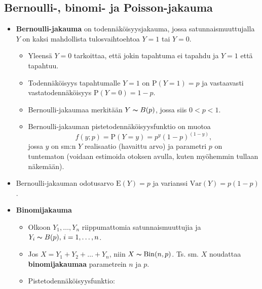 \documentclass[
]{book}
\providecommand{\tightlist}{%
  \setlength{\itemsep}{0pt}\setlength{\parskip}{0pt}}
\begin{document}
\hypertarget{bernoulli--binomi--ja-poisson-jakauma}{%
\subsection{Bernoulli-, binomi- ja Poisson-jakauma}\label{bernoulli--binomi--ja-poisson-jakauma}}

\begin{itemize}
\tightlist
\item
  \textbf{Bernoulli-jakauma} on todennäköisyysjakauma, jossa satunnaismuuttujalla \(Y\) on kaksi mahdollista tulosvaihtoehtoa \(Y=1\) tai \(Y=0\).

  \begin{itemize}
  \tightlist
  \item
    Yleensä \(Y=0\) tarkoittaa, että jokin tapahtuma ei tapahdu ja \(Y=1\) että tapahtuu.
  \item
    Todennäköisyys tapahtumalle \(Y=1\) on \(\text{P}(Y=1)=p\) ja vastaavasti vastatodennäköisyys \(\text{P}(Y=0)=1-p\).
  \item
    Bernoulli-jakaumaa merkitään \(Y \thicksim B(p)\), jossa siis \(0 < p < 1\).
  \item
    Bernoulli-jakauman pistetodennäköisyysfunktio on muotoa
    \[
    f(y; p) = \text{P}(Y=y) = p^y (1-p)^{(1-y)},
    \]
    jossa \(y\) on sm:n \(Y\) realisaatio (havaittu arvo) ja parametri \(p\) on tuntematon (voidaan estimoida otoksen avulla, kuten myöhemmin tullaan näkemään).
  \end{itemize}
\item
  Bernoulli-jakauman odotusarvo \(\text{E}(Y)=p\) ja varianssi \(\mathrm{Var}(Y)=p (1-p)\).
\end{itemize}

\hfill\break

\begin{itemize}
\tightlist
\item
  \textbf{Binomijakauma}

  \begin{itemize}
  \tightlist
  \item
    Olkoon \(Y_1, \ldots, Y_n\) riippumattomia satunnaismuuttujia ja \(Y_i \thicksim B(p), \, i=1,\ldots,n\).
  \item
    Jos \(X = Y_1 + Y_2 + \ldots + Y_n\), niin \(X \thicksim \mathrm{Bin}(n,p)\). Ts. sm. \(X\) noudattaa \textbf{binomijakaumaa} parametrein \(n\) ja \(p\).
  \item
    Pistetodennäköisyysfunktio:
  \end{itemize}
\end{itemize}
\end{document}
